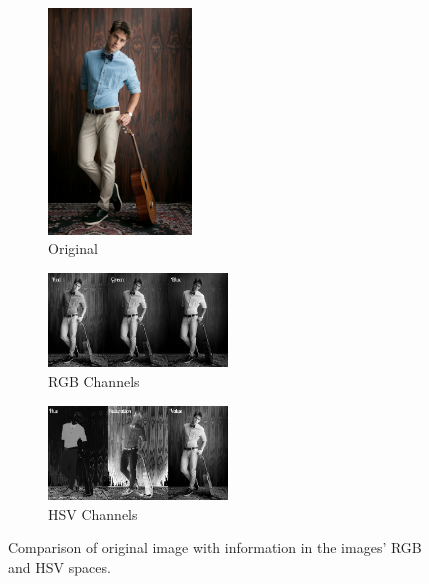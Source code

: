 \documentclass[11pt,letterpaper,journal]{IEEEtran}
\begin{document}
\begin{figure}[t]

  \begin{subfigure}[t]{0.3\linewidth}
  \centering
        \includegraphics[height=6cm]{ChadWhite-color.jpg}
        \caption{Original}
        \label{fig:color}
  \end{subfigure}
  \quad
  \begin{subfigure}[t]{0.3\linewidth}
          \centering
              \includegraphics[height=2.5cm]{ChadWhite-RGB.jpg}
        \caption{RGB Channels}
          \label{fig:rgb}
  \end{subfigure}
  \quad
  \begin{subfigure}[t]{0.3\linewidth}
          \centering
              \includegraphics[height=2.5cm]{ChadWhite-HSV.jpg}
        \caption{HSV Channels}
          \label{fig:hsv}
  \end{subfigure}
  \caption{Comparison of original image with information in the images' RGB and HSV spaces.}
  \label{fig:spaces}
\end{figure}
\end{document}
